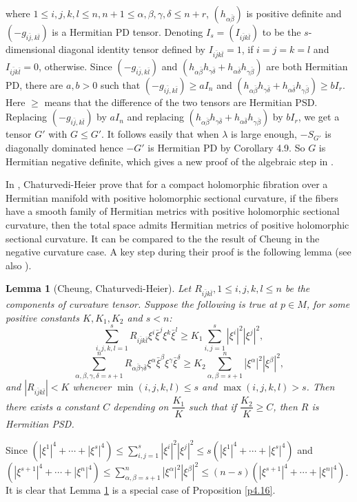 \documentclass[10pt,reqno]{amsart}
\newtheorem{lem}[thm]{Lemma}
\theoremstyle{definition}
\begin{document}
where $1\leq i,j,k,l\leq n, n+1\leq \alpha, \beta, \gamma,\delta\leq n+r$, $(h_{\alpha\bar{\beta}})$ is positive definite and  $(-g_{i\bar{j},k\bar{l}})$ is a Hermitian PD tensor. Denoting $I_s=(I_{i\bar{j}k\bar{l}})$ to be the $s$-dimensional diagonal identity tensor defined by $I_{i\bar{j}k\bar{l}}=1$, if $i=j=k=l$ and $I_{i\bar{j}k\bar{l}}=0 $, otherwise. Since $(-g_{i\bar{j},k\bar{l}})$ and $(h_{\alpha\bar{\beta}}h_{\gamma\bar{\delta}}+h_{\alpha\bar{\delta}}h_{\gamma\bar{\beta}})$ are both Hermitian PD, there are $a, b>0$ such that $(-g_{i\bar{j},k\bar{l}})\geq a I_n$ and $(h_{\alpha\bar{\beta}}h_{\gamma\bar{\delta}}+h_{\alpha\bar{\delta}}h_{\gamma\bar{\beta}})\geq bI_r$. Here $\geq$ means that the difference of the two tensors are Hermitian PSD. Replacing $(-g_{i\bar{j},k\bar{l}})$ by $a I_n$ and replacing $(h_{\alpha\bar{\beta}}h_{\gamma\bar{\delta}}+h_{\alpha\bar{\delta}}h_{\gamma\bar{\beta}})$ by $bI_{r}$, we get a tensor $G'$ with $G\leq G'$. It follows easily that when $\lambda$ is large enough, $-S_{G'}$ is diagonally dominated hence $-G'$ is Hermitian PD by Corollary 4.9. So $G$ is Hermitian negative definite, which gives a new proof of the algebraic step in \cite{AHZ}.

 In \cite{CH}, Chaturvedi-Heier prove that for a compact holomorphic fibration over a Hermitian manifold with positive holomorphic sectional curvature, if the fibers have a smooth family of Hermitian metrics with positive holomorphic sectional curvature,  
then the total space admits Hermitian metrics of positive holomorphic sectional curvature. It can be compared to the the result of Cheung \cite{C} in the negative curvature case. A key step during their proof is the following lemma (see also \cite{C}).
\begin{lem}[Cheung, Chaturvedi-Heier] \label{l5.3} Let $R_{i\bar{j}k\bar{l}}, 1\leq i,j,k,l\leq n$ be the components of curvature tensor. Suppose the following is true at $p\in M$, for some positive constants $K,K_1,K_2$ and $s<n$:
$$\sum_{i,j,k,l=1}^s R_{i\bar{j}k\bar{l}}\xi^i\bar{\xi}^j\xi^k\bar{\xi}^l\geq K_1\sum_{i,j=1}^s |\xi^i|^2|\xi^j|^2,$$
$$\sum_{\alpha,\beta,\gamma,\delta=s+1}^n R_{\alpha\bar{\beta}\gamma\bar{\delta}}\xi^\alpha\bar{\xi}^\beta\xi^\gamma\bar{\xi}^\delta\geq K_2\sum_{\alpha,\beta=s+1}^n |\xi^\alpha|^2|\xi^\beta|^2,$$
and $|R_{i\bar{j}k\bar{l}}|<K$ whenever $\min(i,j,k,l)\leq s$ and $\max(i,j,k,l)>s$. Then there exists a constant $C$ depending on $\dfrac{K_1}{K}$ such that if $\dfrac{K_2}{K}\geq C$, then $R$ is Hermitian PSD.
\end{lem} 
Since $(|\xi^1|^4+\cdots+|\xi^s|^4)\leq \sum_{i,j=1}^s |\xi^i|^2|\xi^j|^2\leq s(|\xi^1|^4+\cdots+|\xi^s|^4)$ and $(|\xi^{s+1}|^4+\cdots+|\xi^n|^4)\leq \sum_{\alpha,\beta=s+1}^n |\xi^\alpha|^2|\xi^\beta|^2\leq (n-s)(|\xi^{s+1}|^4+\cdots+|\xi^n|^4)$. It is clear that Lemma \ref{l5.3} is a special case of Proposition \ref{p4.16}.\\
\end{document}
